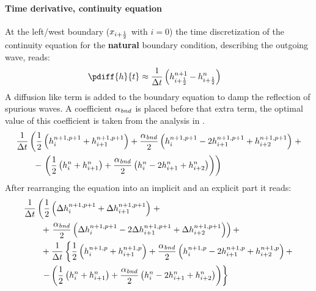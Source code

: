 \paragraph*{Time derivative, continuity equation}
At the left/west boundary ($x_{i+\frac{1}{2}}$ with $i=0$) the time discretization of the continuity equation for the \textbf{natural} boundary condition, describing the outgoing wave, reads:
\begin{align}
    \pdiff{h}{t} & \approx \frac{1}{\Dt} \left(  h^{n+1}_{i+\half} - h^{n}_{i+\half} \right)
\end{align}
A diffusion like term is added to the boundary equation to damp the reflection of spurious waves.
A coefficient $\alpha_{\it bnd}$ is placed before that extra term, the optimal value of this coefficient is taken from the analysis in \citet{JanMooiman2025}.
\begin{align}
    & \frac{1}{\Delta t}\left( \frac{1}{2} \left( h^{n+1,p+1}_{i} + h^{n+1,p+1}_{i+1} \right)
    + \frac{\alpha_{\it bnd}}{2} \left( h^{n+1,p+1}_{i} - 2 h^{n+1,p+1}_{i+1} + h^{n+1,p+1}_{i+2}  \right) \right. +
    \nonumber \\*
    & \qquad  - \left. \left(
    \frac{1}{2} \left( h^{n}_{i} + h^{n}_{i+1} \right)
    + \frac{\alpha_{\it bnd}}{2}  \left( h^{n}_{i} - 2 h^{n}_{i+1} + h^{n}_{i+2}  \right) \right)
    \right)
\end{align}
After rearranging the equation into an implicit and an explicit part it reads:
\begin{align}
    & \frac{1}{\Delta t}  \left( \frac{1}{2} \left( \Delta h^{n+1, p+1}_{i} + \Delta h^{n+1, p+1}_{i+1} \right) \right. +
    \nonumber \\*
    & \qquad + \left. \frac{\alpha_{\it bnd}}{2}\left( \Delta h^{n+1,p+1}_{i} - 2 \Delta h^{n+1,p+1}_{i+1} + \Delta h^{n+1,p+1}_{i+2} \right) \right) +
    \nonumber \\
    & \qquad + \frac{1}{\Delta t} \left\{ \frac{1}{2} \left( h^{n+1, p}_{i} + h^{n+1, p}_{i+1} \right)
    + \frac{\alpha_{\it bnd}}{2}\left(  h^{n+1,p}_{i} - 2 h^{n+1,p}_{i+1}  + h^{n+1,p}_{i+2} \right) + \right.
    \nonumber \\*
    &
    \qquad \left. - \left( \frac{1}{2} \left( h^{n}_{i} + h^{n}_{i+1} \right)
    + \frac{\alpha_{\it bnd}}{2}  \left( h^{n}_{i} - 2 h^{n}_{i+1} + h^{n}_{i+2}  \right) \right) \right\}
\end{align}

